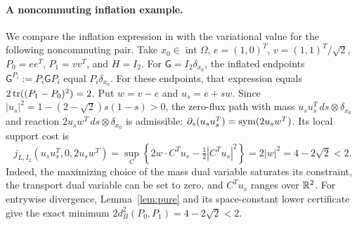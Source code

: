\paragraph{A noncommuting inflation example.}
We compare the inflation expression in
\cite[Proposition 4.4, equation (4.12)]{LiZou} with the variational value
for the following noncommuting pair. Take
$x_0\in\operatorname{int}\Omega$, $e=(1,0)^T$, $v=(1,1)^T/\sqrt2$,
$P_0=ee^T$, $P_1=vv^T$, and $H=I_2$.
For $\mathsf G=I_2\delta_{x_0}$, the inflated endpoints
$\mathsf G^{P_i}:=P_i\mathsf G P_i$ equal $P_i\delta_{x_0}$.
For these endpoints, that expression equals $2\operatorname{tr}((P_1-P_0)^2)=2$.
Put $w=v-e$ and $u_s=e+sw$. Since
$|u_s|^2=1-(2-\sqrt2)s(1-s)>0$, the zero-flux path with mass
$u_su_s^T\,ds\otimes\delta_{x_0}$ and reaction
$2u_sw^T\,ds\otimes\delta_{x_0}$ is admissible:
$\partial_s(u_su_s^T)=\operatorname{sym}(2u_sw^T)$.
Its local support cost is
\[
 j_{L,I_2}(u_su_s^T,0,2u_sw^T)
 =\sup_C\left\{2w\cdot C^Tu_s-\tfrac12|C^Tu_s|^2\right\}
 =2|w|^2=4-2\sqrt2<2.
\]
Indeed, the maximizing choice of the mass dual variable saturates its
constraint, the transport dual variable can be set to zero, and
$C^Tu_s$ ranges over $\mathbb R^2$.
For entrywise divergence, Lemma~\ref{lem:pure} and its space-constant
lower certificate give the exact minimum
$2d_B^2(P_0,P_1)=4-2\sqrt2<2$.

